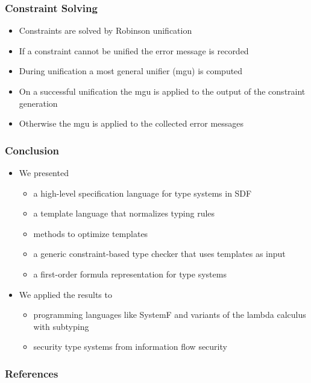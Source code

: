 \documentclass{beamer}
\begin{document}
\renewcommand*\selectConstraintSolving{orange}
\renewcommand*\selectConstraintSolving{}

\begin{frame}
  \frametitle{Constraint Solving}
  \begin{itemize}
  \item Constraints are solved by Robinson unification
  \item If a constraint cannot be unified the error message is recorded
  \item During unification a most general unifier (mgu) is computed
  \item On a successful unification the mgu is applied to the output
    of the constraint generation
  \item Otherwise the mgu is applied to the collected error messages
  \end{itemize}
\end{frame}

\begin{frame}
  \frametitle{Conclusion}
  \begin{itemize}
  \item We presented
    \begin{itemize}
    \item a high-level specification language for type systems in SDF
    \item a template language that normalizes typing rules
    \item methods to optimize templates
    \item a generic constraint-based type checker that uses templates
      as input
    \item a first-order formula representation for type systems
    \end{itemize}
  \item We applied the results to
    \begin{itemize}
    \item programming languages like SystemF and variants of the lambda
      calculus with subtyping
    \item security type systems from information flow
      security~\cite{Volpano:1996:STS:353629.353648}
    \end{itemize}
  \end{itemize}
\end{frame}

\begin{frame}
  \frametitle{References}
  
  
\end{frame}
\end{document}
